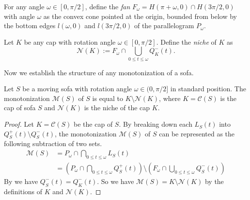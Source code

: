\begin{definition}

For any angle \(\omega \in [0, \pi/2]\), define the \emph{fan} \(F_\omega = H(\pi+\omega, 0) \cap H(3\pi/2, 0)\) with angle \(\omega\) as the convex cone pointed at the origin, bounded from below by the bottom edges \(l(\omega, 0)\) and \(l(3\pi/2, 0)\) of the parallelogram \(P_\omega\).

\label{def:fan}
\end{definition}

\begin{definition}

Let \(K\) be any cap with rotation angle \(\omega \in [0, \pi/2]\). Define the \emph{niche} of \(K\) as
\[
\mathcal{N}(K) := F_{\omega} \cap \bigcup_{0 \leq t \leq \omega} Q^-_K(t).
\]

\label{def:niche}
\end{definition}

Now we establish the structure of any monotonization of a sofa.

\begin{theorem}

Let \(S\) be a moving sofa with rotation angle \(\omega \in (0, \pi/2]\) in standard position. The monotonization \(\mathcal{M}(S)\) of \(S\) is equal to \(K \setminus \mathcal{N}(K)\), where \(K = \mathcal{C}(S)\) is the cap of sofa \(S\) and \(\mathcal{N}(K)\) is the niche of the cap \(K\).

\label{thm:monotonization-structure}
\end{theorem}

\begin{proof}
Let \(K = \mathcal{C}(S)\) be the cap of \(S\). By breaking down each \(L_S(t)\) into \(Q_S^+(t) \setminus Q_S^-(t)\), the monotonization \(\mathcal{M}(S)\) of \(S\) can be represented as the following subtraction of two sets.
\begin{equation}
\label{eqn:monotonization}
\begin{split}
\mathcal{M}(S) & = P_\omega \cap \bigcap_{0 \leq t \leq \omega} L_S(t) \\
& = \left( P_\omega \cap \bigcap_{0 \leq t \leq \omega} Q^+_S(t) \right) \setminus \left( F_\omega \cap \bigcup_{0 \leq t \leq \omega} Q^-_S(t) \right)
\end{split}
\end{equation}
By  we have \(Q_S^-(t) = Q_K^-(t)\). So we have \(\mathcal{M}(S) = K \setminus \mathcal{N}(K)\) by the definitions of \(K\) and \(\mathcal{N}(K)\).
\end{proof}

